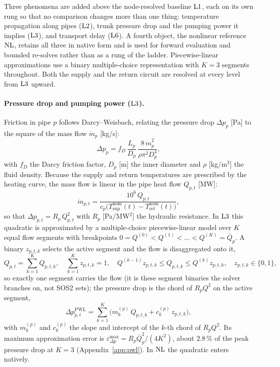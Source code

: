 
Three phenomena are added above the node-resolved baseline $\mathrm{L1}$, each on its own rung so
that no comparison changes more than one thing: temperature propagation along pipes
($\mathrm{L2}$), trunk pressure drop and the pumping power it implies ($\mathrm{L3}$), and transport
delay ($\mathrm{L6}$). A fourth object, the nonlinear reference $\mathrm{NL}$, retains all three in
native form and is used for forward evaluation and bounded re-solves rather than as a rung
of the ladder. Piecewise-linear approximations use a binary multiple-choice representation with $K = 3$ segments
throughout. Both the supply and the return circuit are resolved at every level from
$\mathrm{L3}$ upward.

\paragraph{Pressure drop and pumping power ($\mathrm{L3}$).}
Friction in pipe $p$ follows Darcy--Weisbach, relating the pressure drop $\Delta p_p$ [Pa]
to the square of the mass flow $\dot{m}_p$ [kg/s]:
\begin{equation}
  \Delta p_{p} = f_D\, \frac{L_p}{D_p}\,
    \frac{8\,\dot{m}_p^2}{\rho \pi^2 D_p^4},
  \label{eq:darcy}
\end{equation}
with $f_D$ the Darcy friction factor, $D_p$ [m] the inner diameter and $\rho$ [kg/m$^3$]
the fluid density. Because the supply and return temperatures are prescribed by the
heating curve, the mass flow is linear in the pipe heat flow $Q_{p,t}$ [MW]:
\begin{equation}
  \dot{m}_{p,t} = \frac{10^{6}\, Q_{p,t}}{
    c_p \bigl(T_{\mathrm{sup}}^{\mathrm{nom}}(t)
    - T_{\mathrm{ret}}^{\mathrm{nom}}(t)\bigr)},
  \label{eq:massflow}
\end{equation}
so that $\Delta p_{p,t} = R_p\, Q_{p,t}^2$ with $R_p$ [Pa/MW$^2$] the hydraulic resistance.
In $\mathrm{L3}$ this quadratic is approximated by a multiple-choice piecewise-linear model over $K$
equal flow segments with breakpoints $0 = Q^{(0)} < Q^{(1)} < \dots < Q^{(K)} = \bar{Q}_p$. A
binary $z_{p,t,k}$ selects the active segment and the flow is disaggregated onto it,
\begin{equation}
  Q_{p,t} = \sum_{k=1}^{K} Q_{p,t,k}, \quad
  \sum_{k=1}^{K} z_{p,t,k} = 1, \quad
  Q^{(k-1)} z_{p,t,k} \le Q_{p,t,k} \le Q^{(k)} z_{p,t,k}, \quad z_{p,t,k} \in \{0,1\},
  \label{eq:pressure_pwl_sel}
\end{equation}
so exactly one segment carries the flow (it is these segment binaries the solver branches on,
not SOS2 sets); the pressure drop is the chord of $R_p Q^2$ on the active segment,
\begin{equation}
  \Delta p_{p,t}^{\mathrm{PWL}} = \sum_{k=1}^{K}
    \bigl(m_k^{(p)}\, Q_{p,t,k} + c_k^{(p)}\, z_{p,t,k}\bigr),
  \label{eq:pressure_pwl}
\end{equation}
with $m_k^{(p)}$ and $c_k^{(p)}$ the slope and intercept of the $k$-th chord of $R_p Q^2$. Its
maximum approximation error is $\varepsilon^{\max}_{\Delta p} = R_p \bar{Q}_p^2/(4K^2)$,
about $2.8$\,\% of the peak pressure drop at $K = 3$ (Appendix~\ref{app:pwl}). In $\mathrm{NL}$
the quadratic enters natively.

